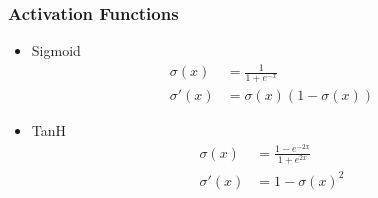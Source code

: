 \documentclass[serif,mathserif]{beamer}
\begin{document}
\begin{frame}
  \frametitle{Activation Functions}
  \begin{itemize}
  \item Sigmoid
    \begin{equation*}
      \begin{split}
        \sigma(x) &= \frac{1}{1+e^{-x}} \\
        \sigma'(x) &= \sigma(x)(1-\sigma(x))
      \end{split}
    \end{equation*}
  \item TanH
    \begin{equation*}
      \begin{split}
        \sigma(x) &= \frac{1-e^{-2x}}{1+e^{2x}} \\
        \sigma'(x) &= 1-\sigma(x)^2
      \end{split}
    \end{equation*}
  \end{itemize}
\end{frame}
\end{document}
